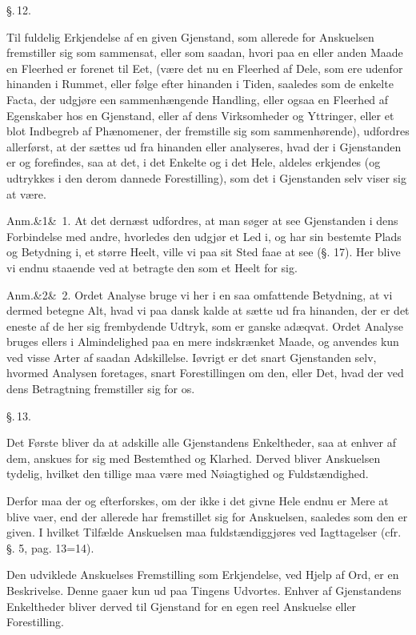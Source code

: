 \documentclass[12pt]{book}
\def\sperr#1{#1}%
\def\textit#1{#1}%
\def\emph#1{#1}%
\newcommand{\sperr}[1]{\textls[180]{#1}}
\newcommand{\parag}[1]{%
  \par\vspace{0.9\baselineskip}%
  {\centering\textit{\S.\,#1.}\par}%
  \vspace{0.35\baselineskip}%
  \noindent\hspace{\parindent}\ignorespaces
}
\newcommand{\anm}[1]{%
  \par\vspace{0.5\baselineskip}%
  \noindent\hspace{\parindent}\sperr{Anm.}\ifx&#1&\else~\textit{#1}.\fi
  \enspace\ignorespaces
}
\newcommand{\opage}[1]{\marginnote{\footnotesize\textit{[#1]}}}
\begin{document}
\parag{12}

Til fuldelig Erkjendelse af en given Gjenstand, som allerede for Anskuelsen
fremstiller sig som sammensat, eller som saadan, hvori paa en eller anden Maade
en Fleerhed er forenet til Eet, (være det nu en Fleerhed af Dele, som ere
udenfor hinanden i Rummet, eller følge efter
\opage{31} hinanden i Tiden, saaledes som de enkelte Facta, der udgjøre een
sammenhængende Handling, eller ogsaa en Fleerhed af Egenskaber hos en
Gjenstand, eller af dens Virksomheder og Yttringer, eller et blot Indbegreb af
Phænomener, der fremstille sig som sammenhørende), udfordres allerførst, at der
\emph{sættes ud fra hinanden} eller \emph{analyseres}, hvad der i Gjenstanden er
og forefindes, saa at det, i det Enkelte og i det Hele, aldeles erkjendes (og
udtrykkes i den derom dannede Forestilling), som det i Gjenstanden selv viser
sig at være.

\anm{1} At det dernæst udfordres, at man søger at see Gjenstanden i dens
Forbindelse med andre, hvorledes den udgjør et Led i, og har sin bestemte Plads
og Betydning i, et større Heelt, ville vi paa sit Sted faae at see (§. 17). Her
blive vi endnu staaende ved at betragte den som et Heelt for sig.

\anm{2} Ordet \emph{Analyse} bruge vi her i en saa omfattende Betydning, at vi
dermed betegne Alt, hvad vi paa dansk kalde at \emph{sætte ud fra hinanden}, der
er det eneste af de her sig frembydende Udtryk, som er ganske adæqvat. Ordet
\emph{Analyse} bruges ellers i Almindelighed paa en mere indskrænket Maade, og
anvendes kun ved visse Arter af saadan Adskillelse. Iøvrigt er det snart
Gjenstanden selv, hvormed Analysen foretages, snart Forestillingen om den, eller
Det, hvad der ved dens Betragtning fremstiller sig for os.
\opage{32} \parag{13}

\emph{Det Første} bliver da at adskille alle Gjenstandens Enkeltheder, saa at
enhver af dem, anskues for sig med \emph{Bestemthed og Klarhed}. Derved bliver
Anskuelsen \emph{tydelig}, hvilket den tillige maa være med \emph{Nøiagtighed og
Fuldstændighed}.

Derfor maa der og efterforskes, om der ikke i det givne Hele endnu er Mere at
blive vaer, end der allerede har fremstillet sig for Anskuelsen, saaledes som
den er given. I hvilket Tilfælde Anskuelsen maa fuldstændiggjøres ved
Iagttagelser (cfr. §. 5, pag. 13=14).

Den udviklede Anskuelses Fremstilling som Erkjendelse, ved Hjelp af Ord, er en
\emph{Beskrivelse}. Denne gaaer kun ud paa Tingens Udvortes. Enhver af
Gjenstandens Enkeltheder bliver derved til Gjenstand for en egen reel Anskuelse
eller Forestilling.
\end{document}

